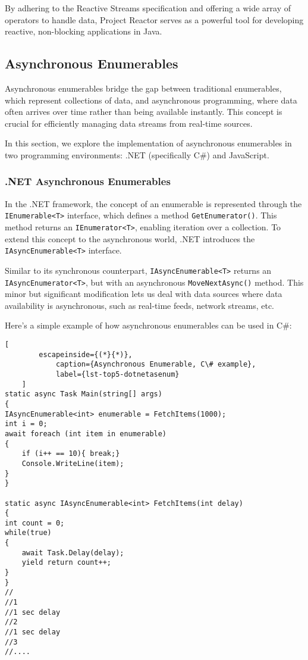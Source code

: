 By adhering to the Reactive Streams specification and offering a wide array of operators to handle data, Project Reactor serves as a powerful tool for developing reactive, non-blocking applications in Java.


\subsection{Asynchronous Enumerables}
\label{sec:aenums}
Asynchronous enumerables bridge the gap between traditional enumerables, which represent collections of data, and asynchronous programming, where data often arrives over time rather than being available instantly. This concept is crucial for efficiently managing data streams from real-time sources.

In this section, we explore the implementation of asynchronous enumerables in two programming environments: .NET (specifically C\#) and JavaScript.

\subsubsection{.NET Asynchronous Enumerables}
\label{csenums}
In the .NET framework, the concept of an enumerable is represented through the \texttt{IEnumerable<T>} interface, which defines a method \texttt{GetEnumerator()}. This method returns an \texttt{IEnumerator<T>}, enabling iteration over a collection. To extend this concept to the asynchronous world, .NET introduces the \texttt{IAsyncEnumerable<T>} interface.

Similar to its synchronous counterpart, \texttt{IAsyncEnumerable<T>} returns an \texttt{IAsyncEnumerator<T>}, but with an asynchronous \texttt{MoveNextAsync()} method. This minor but significant modification lets us deal with data sources where data availability is asynchronous, such as real-time feeds, network streams, etc.

Here's a simple example of how asynchronous enumerables can be used in C\#:

\begin{center}
	\lstset{basicstyle=\scriptsize\ttfamily,frame=bottomline}
	\begin{lstlisting}[
		escapeinside={(*}{*)},
			caption={Asynchronous Enumerable, C\# example},
			label={lst-top5-dotnetasenum}
	]
static async Task Main(string[] args)
{
IAsyncEnumerable<int> enumerable = FetchItems(1000);
int i = 0;
await foreach (int item in enumerable)
{
	if (i++ == 10){ break;}
	Console.WriteLine(item);
}
}

static async IAsyncEnumerable<int> FetchItems(int delay)
{
int count = 0;
while(true)
{
	await Task.Delay(delay);
	yield return count++;
}
}
//
//1
//1 sec delay
//2
//1 sec delay
//3
//....
	\end{lstlisting}
\end{center}

